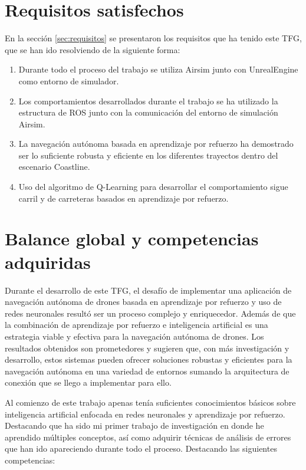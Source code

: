 \section{Requisitos satisfechos}
\label{requisitos_satisfechos}

En la sección \ref{sec:requisitos} se presentaron los requisitos que ha tenido este TFG, que se han ido resolviendo 
de la siguiente forma: 

\begin{enumerate}
    \item Durante todo el proceso del trabajo se utiliza Airsim junto con UnrealEngine como entorno de simulador.
    \item Los comportamientos desarrollados durante el trabajo se ha utilizado la estructura de ROS junto con la comunicación
    del entorno de simulación Airsim. 
    \item La navegación autónoma basada en aprendizaje por refuerzo ha demostrado ser lo suficiente robusta y eficiente en los
    diferentes trayectos dentro del escenario Coastline. 
    \item Uso del algoritmo de Q-Learning para desarrollar el comportamiento sigue carril y de carreteras basados en aprendizaje por 
    refuerzo.
\end{enumerate}


\section{Balance global y competencias adquiridas}
\label{balance_global_competencias_adquiridas}
Durante el desarrollo de este TFG, el desafío de implementar una aplicación de navegación autónoma de drones basada en
aprendizaje por refuerzo y uso de redes neuronales resultó ser un proceso complejo y enriquecedor. Además de que la
combinación de aprendizaje por refuerzo e inteligencia artificial es una estrategia viable y efectiva para la
navegación autónoma de drones. Los resultados obtenidos son prometedores y sugieren que, con más investigación y
desarrollo, estos sistemas pueden ofrecer soluciones robustas y eficientes para la navegación autónoma en una variedad
de entornos sumando la arquitectura de conexión que se llego a implementar para ello. 

Al comienzo de este trabajo apenas tenía suficientes conocimientos básicos sobre inteligencia artificial enfocada en
redes neuronales y aprendizaje por refuerzo. Destacando que ha sido mi primer trabajo de investigación en donde he
aprendido múltiples conceptos, así como adquirir técnicas de análisis de errores que han ido apareciendo durante todo
el proceso. Destacando las siguientes competencias: 

